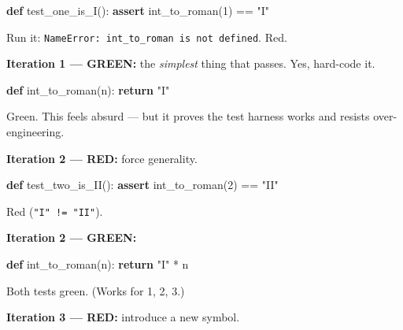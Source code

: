 \documentclass[11pt]{article}
\newenvironment{Shaded}{\begin{snugshade}}{\end{snugshade}}
\newcommand{\ControlFlowTok}[1]{\textcolor[rgb]{0.99,0.74,0.29}{\textbf{#1}}}
\newcommand{\DecValTok}[1]{\textcolor[rgb]{0.96,0.45,0.00}{#1}}
\newcommand{\KeywordTok}[1]{\textcolor[rgb]{0.81,0.81,0.76}{\textbf{#1}}}
\newcommand{\NormalTok}[1]{\textcolor[rgb]{0.81,0.81,0.76}{#1}}
\newcommand{\OperatorTok}[1]{\textcolor[rgb]{0.81,0.81,0.76}{#1}}
\newcommand{\StringTok}[1]{\textcolor[rgb]{0.96,0.31,0.31}{#1}}
\begin{document}

\begin{Shaded}
\begin{Highlighting}[]
\KeywordTok{def}\NormalTok{ test\_one\_is\_I():}
    \ControlFlowTok{assert}\NormalTok{ int\_to\_roman(}\DecValTok{1}\NormalTok{) }\OperatorTok{==} \StringTok{"I"}
\end{Highlighting}
\end{Shaded}

Run it: \texttt{NameError:\ int\_to\_roman\ is\ not\ defined}. Red.

\textbf{Iteration 1 --- GREEN:} the \emph{simplest} thing that passes. Yes, hard-code it.


\begin{Shaded}
\begin{Highlighting}[]
\KeywordTok{def}\NormalTok{ int\_to\_roman(n):}
    \ControlFlowTok{return} \StringTok{"I"}
\end{Highlighting}
\end{Shaded}

Green. This feels absurd --- but it proves the test harness works and resists over-engineering.

\textbf{Iteration 2 --- RED:} force generality.


\begin{Shaded}
\begin{Highlighting}[]
\KeywordTok{def}\NormalTok{ test\_two\_is\_II():}
    \ControlFlowTok{assert}\NormalTok{ int\_to\_roman(}\DecValTok{2}\NormalTok{) }\OperatorTok{==} \StringTok{"II"}
\end{Highlighting}
\end{Shaded}

Red (\texttt{"I"\ !=\ "II"}).

\textbf{Iteration 2 --- GREEN:}


\begin{Shaded}
\begin{Highlighting}[]
\KeywordTok{def}\NormalTok{ int\_to\_roman(n):}
    \ControlFlowTok{return} \StringTok{"I"} \OperatorTok{*}\NormalTok{ n}
\end{Highlighting}
\end{Shaded}

Both tests green. (Works for 1, 2, 3.)

\textbf{Iteration 3 --- RED:} introduce a new symbol.
\end{document}

